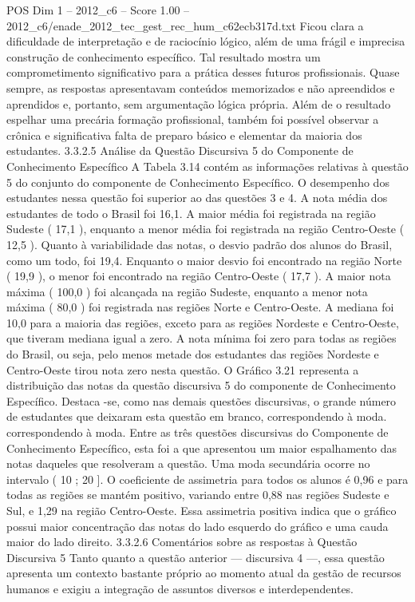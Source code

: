 \begin{textsample}{POS Dim 1 – 2012\_c6 – Score 1.00 – 2012\_c6/enade\_2012\_tec\_gest\_rec\_hum\_c62ecb317d.txt}
Ficou clara a dificuldade de interpretação e de raciocínio lógico, além de uma frágil e imprecisa construção de conhecimento específico.
Tal resultado mostra um comprometimento significativo para a prática desses futuros profissionais.
Quase sempre, as respostas apresentavam conteúdos memorizados e não apreendidos e aprendidos e, portanto, sem argumentação lógica própria.
Além de o resultado espelhar uma precária formação profissional, também foi possível observar a crônica e significativa falta de preparo básico e elementar da maioria dos estudantes. 3.3.2.5 Análise da Questão Discursiva 5 do Componente de Conhecimento Específico A Tabela 3.14 contém as informações relativas à questão 5 do conjunto do componente de Conhecimento Específico.
O desempenho dos estudantes nessa questão foi superior ao das questões 3 e 4.
A nota média dos estudantes de todo o Brasil foi 16,1.
A maior média foi registrada na região Sudeste ( 17,1 ), enquanto a menor média foi registrada na região Centro-Oeste ( 12,5 ).
Quanto à variabilidade das notas, o desvio padrão dos alunos do Brasil, como um todo, foi 19,4.
Enquanto o maior desvio foi encontrado na região Norte ( 19,9 ), o menor foi encontrado na região Centro-Oeste ( 17,7 ).
A maior nota máxima ( 100,0 ) foi alcançada na região Sudeste, enquanto a menor nota máxima ( 80,0 ) foi registrada nas regiões Norte e Centro-Oeste.
A mediana foi 10,0 para a maioria das regiões, exceto para as regiões Nordeste e Centro-Oeste, que tiveram mediana igual a zero.
A nota mínima foi zero para todas as regiões do Brasil, ou seja, pelo menos metade dos estudantes das regiões Nordeste e Centro-Oeste tirou nota zero nesta questão.
O Gráfico 3.21 representa a distribuição das notas da questão discursiva 5 do componente de Conhecimento Específico.
Destaca -se, como nas demais questões discursivas, o grande número de estudantes que deixaram esta questão em branco, correspondendo à moda. correspondendo à moda.
Entre as três questões discursivas do Componente de Conhecimento Específico, esta foi a que apresentou um maior espalhamento das notas daqueles que resolveram a questão.
Uma moda secundária ocorre no intervalo ( 10 ; 20 ].
O coeficiente de assimetria para todos os alunos é 0,96 e para todas as regiões se mantém positivo, variando entre 0,88 nas regiões Sudeste e Sul, e 1,29 na região Centro-Oeste.
Essa assimetria positiva indica que o gráfico possui maior concentração das notas do lado esquerdo do gráfico e uma cauda maior do lado direito. 3.3.2.6 Comentários sobre as respostas à Questão Discursiva 5 Tanto quanto a questão anterior — discursiva 4 —, essa questão apresenta um contexto bastante próprio ao momento atual da gestão de recursos humanos e exigiu a integração de assuntos diversos e interdependentes.

\end{textsample}
